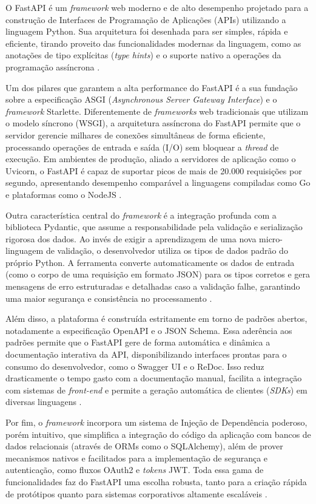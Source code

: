 O FastAPI é um \textit{framework} web moderno e de alto desempenho projetado para a construção de Interfaces de Programação de Aplicações (APIs) utilizando a linguagem Python. Sua arquitetura foi desenhada para ser simples, rápida e eficiente, tirando proveito das funcionalidades modernas da linguagem, como as anotações de tipo explícitas (\textit{type hints}) e o suporte nativo a operações da programação assíncrona \cite{fastapi2026}.

Um dos pilares que garantem a alta performance do FastAPI é a sua fundação sobre a especificação ASGI (\textit{Asynchronous Server Gateway Interface}) e o \textit{framework} Starlette. Diferentemente de \textit{frameworks} web tradicionais que utilizam o modelo síncrono (WSGI), a arquitetura assíncrona do FastAPI permite que o servidor gerencie milhares de conexões simultâneas de forma eficiente, processando operações de entrada e saída (I/O) sem bloquear a \textit{thread} de execução. Em ambientes de produção, aliado a servidores de aplicação como o Uvicorn, o FastAPI é capaz de suportar picos de mais de 20.000 requisições por segundo, apresentando desempenho comparável a linguagens compiladas como Go e plataformas como o NodeJS \cite{dasroot2026}.

Outra característica central do \textit{framework} é a integração profunda com a biblioteca Pydantic, que assume a responsabilidade pela validação e serialização rigorosa dos dados. Ao invés de exigir a aprendizagem de uma nova micro-linguagem de validação, o desenvolvedor utiliza os tipos de dados padrão do próprio Python. A ferramenta converte automaticamente os dados de entrada (como o corpo de uma requisição em formato JSON) para os tipos corretos e gera mensagens de erro estruturadas e detalhadas caso a validação falhe, garantindo uma maior segurança e consistência no processamento \cite{fastapi2026,dunossauro2026}.

Além disso, a plataforma é construída estritamente em torno de padrões abertos, notadamente a especificação OpenAPI e o JSON Schema. Essa aderência aos padrões permite que o FastAPI gere de forma automática e dinâmica a documentação interativa da API, disponibilizando interfaces prontas para o consumo do desenvolvedor, como o Swagger UI e o ReDoc. Isso reduz drasticamente o tempo gasto com a documentação manual, facilita a integração com sistemas de \textit{front-end} e permite a geração automática de clientes (\textit{SDKs}) em diversas linguagens \cite{fastapi2026}.

Por fim, o \textit{framework} incorpora um sistema de Injeção de Dependência poderoso, porém intuitivo, que simplifica a integração do código da aplicação com bancos de dados relacionais (através de ORMs como o SQLAlchemy), além de prover mecanismos nativos e facilitados para a implementação de segurança e autenticação, como fluxos OAuth2 e \textit{tokens} JWT. Toda essa gama de funcionalidades faz do FastAPI uma escolha robusta, tanto para a criação rápida de protótipos quanto para sistemas corporativos altamente escaláveis \cite{dunossauro2026}.

